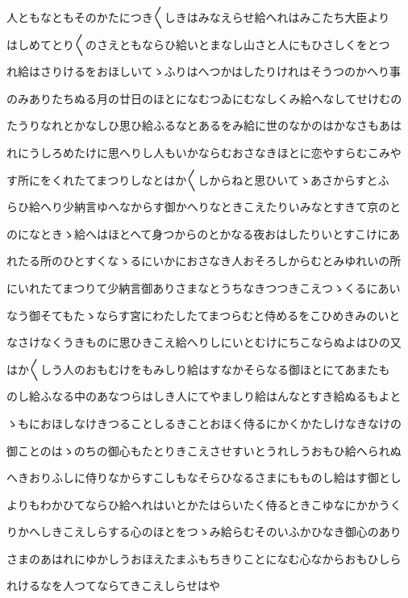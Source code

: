 \documentclass[a4paper,11pt,landscape]{ltjtarticle}
\begin{document}
人ともなともそのかたにつき〱しきはみなえらせ給へれはみこたち大臣より
\par\medskip
はしめてとり〱のさえともならひ給いとまなし山さと人にもひさしくをとつ
\par\medskip
れ給はさりけるをおほしいてゝふりはへつかはしたりけれはそうつのかへり事
\par\medskip
のみありたちぬる月の廿日のほとになむつゐにむなしくみ給へなしてせけむの
\par\medskip
たうりなれとかなしひ思ひ給ふるなとあるをみ給に世のなかのはかなさもあは
\par\medskip
れにうしろめたけに思へりし人もいかならむおさなきほとに恋やすらむこみや
\par\medskip
す所にをくれたてまつりしなとはか〱しからねと思ひいてゝあさからすとふ
\par\medskip
らひ給へり少納言ゆへなからす御かへりなときこえたりいみなとすきて京のと
\par\medskip
のになときゝ給へはほとへて身つからのとかなる夜おはしたりいとすこけにあ
\par\medskip
れたる所のひとすくなゝるにいかにおさなき人おそろしからむとみゆれいの所
\par\medskip
にいれたてまつりて少納言御ありさまなとうちなきつつきこえつゝくるにあい
\par\medskip
なう御そてもたゝならす宮にわたしたてまつらむと侍めるをこひめきみのいと
\par\medskip
なさけなくうきものに思ひきこえ給へりしにいとむけにちこならぬよはひの又
\par\medskip
はか〱しう人のおもむけをもみしり給はすなかそらなる御ほとにてあまたも
\par\medskip
のし給ふなる中のあなつらはしき人にてやましり給はんなとすき給ぬるもよと
\par\medskip
ゝもにおほしなけきつることしるきことおほく侍るにかくかたしけなきなけの
\par\medskip
御ことのはゝのちの御心もたとりきこえさせすいとうれしうおもひ給へられぬ
\par\medskip
へきおりふしに侍りなからすこしもなそらひなるさまにもものし給はす御とし
\par\medskip
よりもわかひてならひ給へれはいとかたはらいたく侍るときこゆなにかかうく
\par\medskip
りかへしきこえしらする心のほとをつゝみ給らむそのいふかひなき御心のあり
\par\medskip
さまのあはれにゆかしうおほえたまふもちきりことになむ心なからおもひしら
\par\medskip
れけるなを人つてならてきこえしらせはや
\end{document}
